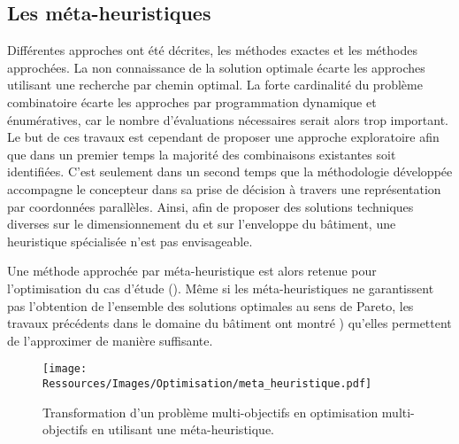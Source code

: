 \subsection{Les méta-heuristiques} %
\label{sub:les_meta_heuristiques}
Différentes approches ont été décrites, les méthodes exactes et les méthodes approchées.
La non connaissance de la solution optimale écarte les approches utilisant une recherche
par chemin optimal. La forte cardinalité du problème combinatoire écarte les approches par
programmation dynamique et énumératives, car le nombre d’évaluations nécessaires serait
alors trop important. Le but de ces travaux est cependant de proposer une approche
exploratoire afin que dans un premier temps la majorité des combinaisons existantes soit
identifiées. C’est seulement dans un second temps que la méthodologie développée
accompagne le concepteur dans sa prise de décision à travers une représentation par
coordonnées parallèles. Ainsi, afin de proposer des solutions techniques diverses sur le
dimensionnement du  et sur l’enveloppe du bâtiment, une heuristique spécialisée n’est
pas envisageable.

Une méthode approchée par méta-heuristique est alors retenue pour l’optimisation du
cas d’étude (). Même si les méta-heuristiques ne garantissent pas
l’obtention de l’ensemble des solutions optimales au sens de Pareto, les travaux
précédents dans le domaine du bâtiment ont montré \parencite{Rivallain2013,Recht2016}) qu’elles permettent de
l’approximer de manière suffisante.

\begin{figure}
    \centering
    \texttt{[image: Ressources/Images/Optimisation/meta\_heuristique.pdf]}
    \caption[Transformation d’un problème multi-objectifs en optimisation multi-objectifs]
            {Transformation d’un problème multi-objectifs en optimisation
             multi-objectifs en utilisant une méta-heuristique.}
    \label{fig:multi_meta}
\end{figure}


